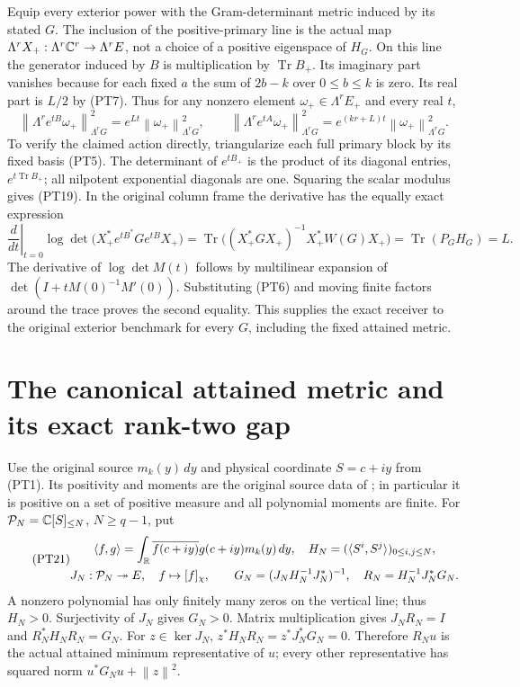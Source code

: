 \documentclass[11pt,a4paper]{article}
\providecommand{\Tr}{\operatorname{Tr}}
\providecommand{\PP}{\mathcal P}
\providecommand{\norm}[1]{\left\lVert#1\right\rVert}
\begin{document}
Equip every exterior power with the Gram-determinant metric induced
by its stated \(G\). The inclusion of the positive-primary line is
the actual map
\(\Lambda^rX_+:\Lambda^r\mathbb C^r\to\Lambda^r E\), not a
choice of a positive eigenspace of \(H_G\). On this line the
generator induced by \(B\) is multiplication by \(\Tr B_+\).
Its imaginary part vanishes because for each fixed \(a\) the
sum of \(2b-k\) over \(0\le b\le k\) is zero. Its real
part is \(L/2\) by (PT7). Thus for any nonzero element
\(\omega_+\in\Lambda^r E_+\) and every real \(t\),
\begin{equation}\tag{PT19}
 \norm{\Lambda^r e^{tB}\omega_+}_{\Lambda^rG}^{2}
       =e^{Lt}\norm{\omega_+}_{\Lambda^rG}^{2},\qquad
 \norm{\Lambda^r e^{tA}\omega_+}_{\Lambda^rG}^{2}
       =e^{(kr+L)t}\norm{\omega_+}_{\Lambda^rG}^{2}.
\end{equation}
To verify the claimed action directly, triangularize each full
primary block by its fixed basis (PT5). The determinant of
\(e^{tB_+}\) is the product of its diagonal entries,
\(e^{t\Tr B_+}\); all nilpotent exponential diagonals are one.
Squaring the scalar modulus gives (PT19). In the original column
frame the derivative has the equally exact expression
\begin{equation}\tag{PT20}
 \left.\frac{d}{dt}\right|_{t=0}
 \log\det\bigl(X_+^*e^{tB^*}Ge^{tB}X_+\bigr)
 =\Tr\bigl((X_+^*GX_+)^{-1}X_+^*W(G)X_+\bigr)
 =\Tr(P_GH_G)=L.
\end{equation}
The derivative of \(\log\det M(t)\) follows by multilinear
expansion of \(\det(I+tM(0)^{-1}M'(0))\). Substituting (PT6)
and moving finite factors around the trace proves the second
equality. This supplies the exact receiver to the original exterior
benchmark for every \(G\), including the fixed attained metric.

\section{The canonical attained metric and its exact rank-two gap}

Use the original source \(m_k(y)\,dy\) and physical coordinate
\(S=c+iy\) from (PT1). Its positivity and moments are the original
source data of \cite{a03pt:gmf}; in particular it is positive on a set
of positive measure and all polynomial moments are finite. For
\(\PP_N=\C[S]_{\le N}\), \(N\ge q-1\), put
\begin{equation}\tag{PT21}
 \begin{gathered}
 \langle f,g\rangle=\int_\R\overline{f(c+iy)}g(c+iy)m_k(y)\,dy,
 \quad H_N=(\langle S^i,S^j\rangle)_{0\le i,j\le N},\\
 J_N:\PP_N\twoheadrightarrow E,\quad f\mapsto[f]_\chi,\qquad
 G_N=(J_NH_N^{-1}J_N^*)^{-1},\quad
 R_N=H_N^{-1}J_N^*G_N.
 \end{gathered}
\end{equation}
A nonzero polynomial has only finitely many zeros on the vertical
line; thus \(H_N>0\). Surjectivity of \(J_N\) gives \(G_N>0\).
Matrix multiplication gives \(J_NR_N=I\) and
\(R_N^*H_NR_N=G_N\). For \(z\in\ker J_N\),
\(z^*H_NR_N=z^*J_N^*G_N=0\). Therefore \(R_Nu\) is the
actual attained minimum representative of \(u\); every other
representative has squared norm \(u^*G_Nu+\norm z^2\).
\end{document}
